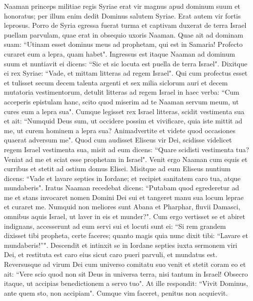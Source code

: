 \begin{biblechapter}  
\verse Naaman princeps militiae regis Syriae erat vir magnus apud dominum suum et honoratus; per illum enim dedit Dominus salutem Syriae. Erat autem vir fortis leprosus. 
\verse Porro de Syria egressa fuerat turma et captivam duxerat de terra Israel puellam parvulam, quae erat in obsequio uxoris Naaman. 
\verse Quae ait ad dominam suam: “Utinam esset dominus meus ad prophetam, qui est in Samaria! Profecto curaret eum a lepra, quam habet". 
\verse Ingressus est itaque Naaman ad dominum suum et nuntiavit ei dicens: “Sic et sic locuta est puella de terra Israel". 
\verse Dixitque ei rex Syriae: “Vade, et mittam litteras ad regem Israel". Qui cum profectus esset et tulisset secum decem talenta argenti et sex milia siclorum auri et decem mutatoria vestimentorum, 
\verse detulit litteras ad regem Israel in haec verba: “Cum acceperis epistulam hanc, scito quod miserim ad te Naaman servum meum, ut cures eum a lepra sua". 
\verse Cumque legisset rex Israel litteras, scidit vestimenta sua et ait: “Numquid Deus sum, ut occidere possim et vivificare, quia iste mittit ad me, ut curem hominem a lepra sua? Animadvertite et videte quod occasiones quaerat adversum me". 
\verse Quod cum audisset Eliseus vir Dei, scidisse videlicet regem Israel vestimenta sua, misit ad eum dicens: “Quare scidisti vestimenta tua? Veniat ad me et sciat esse prophetam in Israel". 
\verse Venit ergo Naaman cum equis et curribus et stetit ad ostium domus Elisei.  
\verse Misitque ad eum Eliseus nuntium dicens: “Vade et lavare septies in Iordane; et recipiet sanitatem caro tua, atque mundaberis". 
\verse Iratus Naaman recedebat dicens: “Putabam quod egrederetur ad me et stans invocaret nomen Domini Dei sui et tangeret manu sua locum leprae et curaret me. 
\verse Numquid non meliores sunt Abana et Pharphar, fluvii Damasci, omnibus aquis Israel, ut laver in eis et munder?". Cum ergo vertisset se et abiret indignans, 
\verse accesserunt ad eum servi sui et locuti sunt ei: “Si rem grandem dixisset tibi propheta, certe faceres; quanto magis quia nunc dixit tibi: “Lavare et mundaberis!”". 
\verse Descendit et intinxit se in Iordane septies iuxta sermonem viri Dei, et restituta est caro eius sicut caro pueri parvuli, et mundatus est. 
\verse Reversusque ad virum Dei cum universo comitatu suo venit et stetit coram eo et ait: “Vere scio quod non sit Deus in universa terra, nisi tantum in Israel! Obsecro itaque, ut accipias benedictionem a servo tuo". 
\verse At ille respondit: “Vivit Dominus, ante quem sto, non accipiam". Cumque vim faceret, penitus non acquievit. 

\end{biblechapter}
